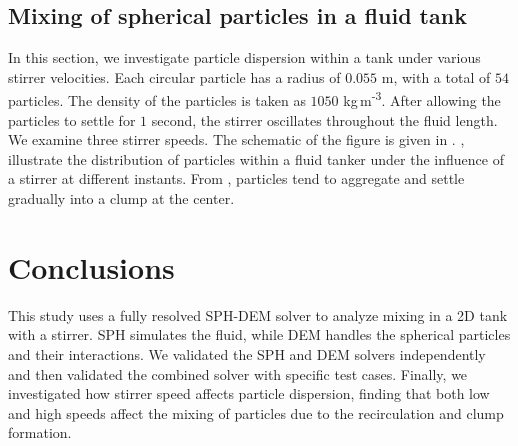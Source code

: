 \documentclass[a4paper,11pt]{book}
\begin{document}
\subsection{Mixing of spherical particles in a fluid tank}
\label{sec:mixing-spherical-particles-in-fluid-tank-homogeneous}
In this section, we investigate particle dispersion within a tank under various
stirrer velocities. Each circular particle has a radius of $0.055$ m, with a
total of $54$ particles.  The density of the particles is taken as $1050$
kg\,m\textsuperscript{-3}.  After allowing the particles to settle for $1$
second, the stirrer oscillates throughout the fluid length. We examine three
stirrer speeds.  The schematic of the figure is given in
.  ,
illustrate the distribution of particles within a fluid tanker under the
influence of a stirrer at different instants. From ,
particles tend to aggregate and settle gradually into a clump at the center.


\section{Conclusions}
This study uses a fully resolved SPH-DEM solver to analyze mixing in a 2D tank
with a stirrer.  SPH simulates the fluid, while DEM handles the
spherical particles and their interactions.  We validated the SPH and DEM
solvers independently and then validated the combined solver with specific test
cases. Finally, we investigated how stirrer speed affects particle dispersion,
finding that both low and high speeds affect the mixing of particles due to the
recirculation and clump formation.
\end{document}
